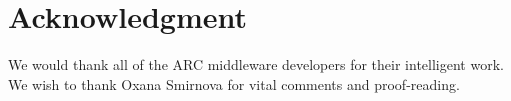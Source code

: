 \documentclass[conference]{IEEEtran}
\begin{document}
%


\section*{Acknowledgment}
We would thank all of the ARC middleware developers for
their intelligent work. We wish to thank Oxana Smirnova for
vital comments and proof-reading.




%
\end{document}
